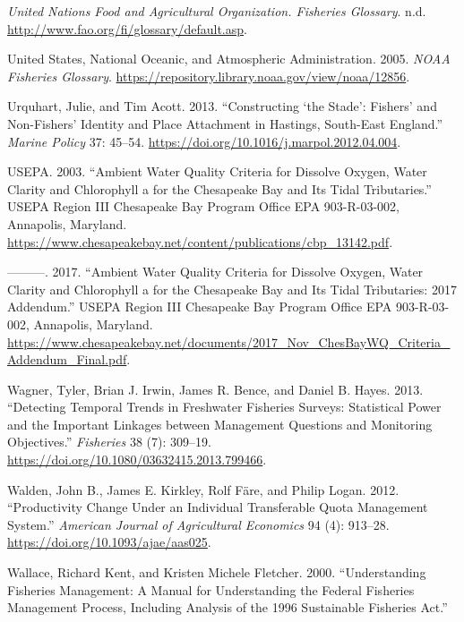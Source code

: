 \documentclass[
]{book}
\newlength{\cslhangindent}
\newenvironment{cslreferences}%
  {\setlength{\parindent}{0pt}%
  \everypar{\setlength{\hangindent}{\cslhangindent}}\ignorespaces}%
  {\par}
\begin{document}
\begin{cslreferences}
\leavevmode\hypertarget{ref-unfao}{}%
\emph{United Nations Food and Agricultural Organization. Fisheries Glossary}. n.d. \url{http://www.fao.org/fi/glossary/default.asp}.

\leavevmode\hypertarget{ref-noaaglos}{}%
United States, National Oceanic, and Atmospheric Administration. 2005. \emph{NOAA Fisheries Glossary}. \url{https://repository.library.noaa.gov/view/noaa/12856}.

\leavevmode\hypertarget{ref-urquhart_constructing_2013}{}%
Urquhart, Julie, and Tim Acott. 2013. ``Constructing `the Stade': Fishers' and Non-Fishers' Identity and Place Attachment in Hastings, South-East England.'' \emph{Marine Policy} 37: 45--54. \url{https://doi.org/10.1016/j.marpol.2012.04.004}.

\leavevmode\hypertarget{ref-usepa2003}{}%
USEPA. 2003. ``Ambient Water Quality Criteria for Dissolve Oxygen, Water Clarity and Chlorophyll a for the Chesapeake Bay and Its Tidal Tributaries.'' USEPA Region III Chesapeake Bay Program Office EPA 903-R-03-002, Annapolis, Maryland. \url{https://www.chesapeakebay.net/content/publications/cbp_13142.pdf}.

\leavevmode\hypertarget{ref-usepa2017}{}%
---------. 2017. ``Ambient Water Quality Criteria for Dissolve Oxygen, Water Clarity and Chlorophyll a for the Chesapeake Bay and Its Tidal Tributaries: 2017 Addendum.'' USEPA Region III Chesapeake Bay Program Office EPA 903-R-03-002, Annapolis, Maryland. \url{https://www.chesapeakebay.net/documents/2017_Nov_ChesBayWQ_Criteria_Addendum_Final.pdf}.

\leavevmode\hypertarget{ref-Wagner2013}{}%
Wagner, Tyler, Brian J. Irwin, James R. Bence, and Daniel B. Hayes. 2013. ``Detecting Temporal Trends in Freshwater Fisheries Surveys: Statistical Power and the Important Linkages between Management Questions and Monitoring Objectives.'' \emph{Fisheries} 38 (7): 309--19. \url{https://doi.org/10.1080/03632415.2013.799466}.

\leavevmode\hypertarget{ref-walden_productivity_2012}{}%
Walden, John B., James E. Kirkley, Rolf Färe, and Philip Logan. 2012. ``Productivity Change Under an Individual Transferable Quota Management System.'' \emph{American Journal of Agricultural Economics} 94 (4): 913--28. \url{https://doi.org/10.1093/ajae/aas025}.

\leavevmode\hypertarget{ref-wallace2000}{}%
Wallace, Richard Kent, and Kristen Michele Fletcher. 2000. ``Understanding Fisheries Management: A Manual for Understanding the Federal Fisheries Management Process, Including Analysis of the 1996 Sustainable Fisheries Act.''


\end{cslreferences}
\end{document}
